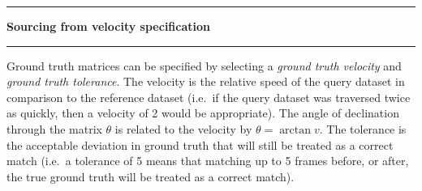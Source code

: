 \noindent\rule{\textwidth}{1pt}
\indent \textbf{Sourcing from velocity specification}
\noindent\rule{\textwidth}{1pt}
\smallskip
\parbox{\textwidth}{Ground truth matrices can be specified by selecting a \textit{ground truth velocity} and \textit{ground truth tolerance}. The velocity is the relative speed of the query dataset in comparison to the reference dataset (i.e.\ if the query dataset was traversed twice as quickly, then a velocity of 2 would be appropriate). The angle of declination through the matrix $\theta$ is related to the velocity by $\theta=\arctan{v}$. The tolerance is the acceptable deviation in ground truth that will still be treated as a correct match (i.e.\ a tolerance of 5 means that matching up to 5 frames before, or after, the true ground truth will be treated as a correct match).}
